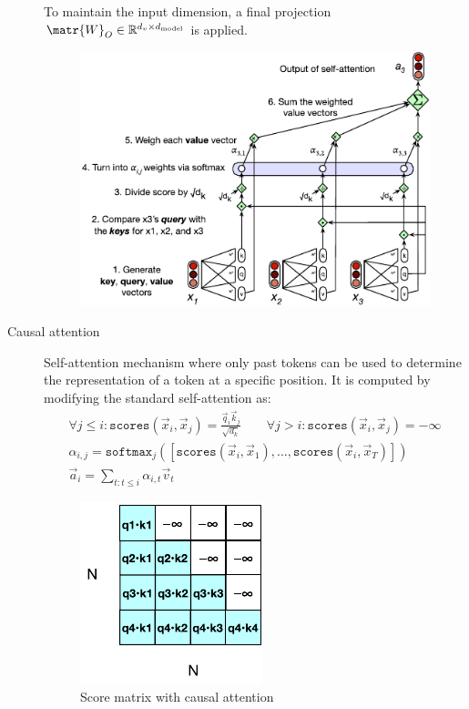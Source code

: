 \begin{description}
        To maintain the input dimension, a final projection $\matr{W}_O \in \mathbb{R}^{d_v \times d_\text{model}}$ is applied.

        \begin{figure}[H]
            \centering
            \includegraphics[width=0.6\linewidth]{./img/_self_attention.pdf}
        \end{figure}


    \item[Causal attention] 
        Self-attention mechanism where only past tokens can be used to determine the representation of a token at a specific position. It is computed by modifying the standard self-attention as:
        \[
            \begin{gathered}
                \forall j \leq i: \texttt{scores}(\vec{x}_i, \vec{x}_j) = \frac{\vec{q}_i \vec{k}_j}{\sqrt{d_k}} \qquad
                \forall j > i: \texttt{scores}(\vec{x}_i, \vec{x}_j) = -\infty \\
                \alpha_{i,j} = \texttt{softmax}_j\left( \left[\texttt{scores}(\vec{x}_i, \vec{x}_1), \dots, \texttt{scores}(\vec{x}_i, \vec{x}_T)\right] \right) \\
                \vec{a}_i = \sum_{t: t \leq i} \alpha_{i,t} \vec{v}_t
            \end{gathered}
        \]

        \begin{figure}[H]
            \centering
            \includegraphics[width=0.2\linewidth]{./img/_masked_attention.pdf}
            \caption{Score matrix with causal attention}
        \end{figure}
\end{description}


